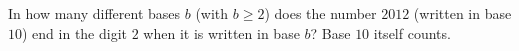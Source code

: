 In how many different bases $b$ (with $b\ge 2$) does the number $2012$ (written in base $10$) end in the digit $2$ when it is written in base $b$? Base $10$ itself counts.
